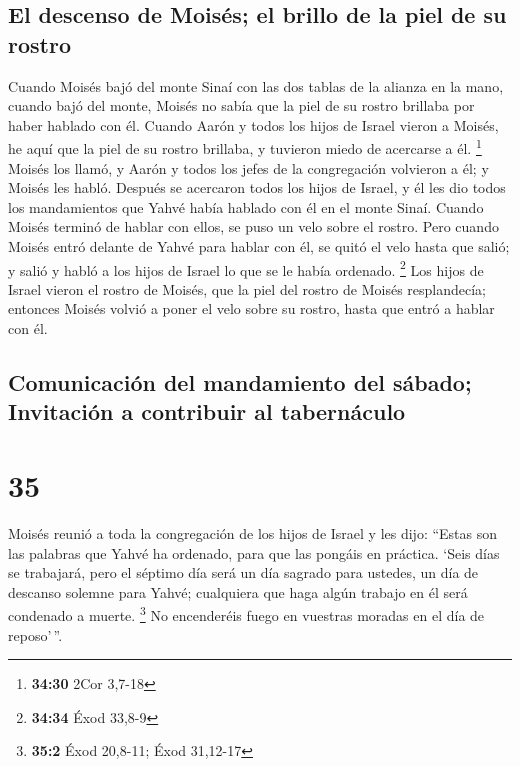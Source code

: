 \hypertarget{el-descenso-de-moisuxe9s-el-brillo-de-la-piel-de-su-rostro}{%
\subsection{El descenso de Moisés; el brillo de la piel de su
rostro}\label{el-descenso-de-moisuxe9s-el-brillo-de-la-piel-de-su-rostro}}

 Cuando Moisés bajó del monte Sinaí con las dos tablas de
la alianza en la mano, cuando bajó del monte, Moisés no sabía que la
piel de su rostro brillaba por haber hablado con él. 
Cuando Aarón y todos los hijos de Israel vieron a Moisés, he aquí que la
piel de su rostro brillaba, y tuvieron miedo de acercarse a él.
\footnote{\textbf{34:30} 2Cor 3,7-18}  Moisés los llamó,
y Aarón y todos los jefes de la congregación volvieron a él; y Moisés
les habló.  Después se acercaron todos los hijos de
Israel, y él les dio todos los mandamientos que Yahvé había hablado con
él en el monte Sinaí.  Cuando Moisés terminó de hablar
con ellos, se puso un velo sobre el rostro.  Pero cuando
Moisés entró delante de Yahvé para hablar con él, se quitó el velo hasta
que salió; y salió y habló a los hijos de Israel lo que se le había
ordenado. \footnote{\textbf{34:34} Éxod 33,8-9}  Los
hijos de Israel vieron el rostro de Moisés, que la piel del rostro de
Moisés resplandecía; entonces Moisés volvió a poner el velo sobre su
rostro, hasta que entró a hablar con él.

\hypertarget{comunicaciuxf3n-del-mandamiento-del-suxe1bado-invitaciuxf3n-a-contribuir-al-tabernuxe1culo}{%
\subsection{Comunicación del mandamiento del sábado; Invitación a
contribuir al
tabernáculo}\label{comunicaciuxf3n-del-mandamiento-del-suxe1bado-invitaciuxf3n-a-contribuir-al-tabernuxe1culo}}

\hypertarget{section-34}{%
\section{35}\label{section-34}}

 Moisés reunió a toda la congregación de los hijos de
Israel y les dijo: ``Estas son las palabras que Yahvé ha ordenado, para
que las pongáis en práctica.  `Seis días se trabajará,
pero el séptimo día será un día sagrado para ustedes, un día de descanso
solemne para Yahvé; cualquiera que haga algún trabajo en él será
condenado a muerte. \footnote{\textbf{35:2} Éxod 20,8-11; Éxod 31,12-17}
 No encenderéis fuego en vuestras moradas en el día de
reposo'\,''.

